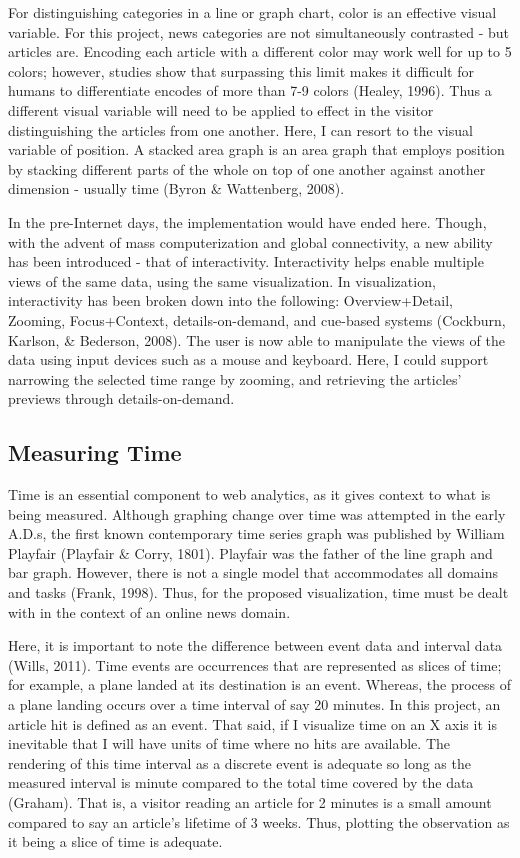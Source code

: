 \documentclass[12pt]{article}
\begin{document}
For distinguishing categories in a line or graph chart, color is an effective visual variable. For this project, news categories are not simultaneously contrasted - but articles are. Encoding each article with a different color may work well for up to 5 colors; however, studies show that surpassing this limit makes it difficult for humans to differentiate encodes of more than 7-9 colors (Healey, 1996). Thus a different visual variable will need to be applied to effect in the visitor distinguishing the articles from one another. Here, I can resort to the visual variable of position. A stacked area graph is an area graph that employs position by stacking different parts of the whole on top of one another against another dimension - usually time (Byron \& Wattenberg, 2008).  

In the pre-Internet days, the implementation would have ended here. Though, with the advent of mass computerization and global connectivity, a new ability has been introduced - that of interactivity. Interactivity helps enable multiple views of the same data, using the same visualization. In visualization, interactivity has been broken down into the following: Overview+Detail, Zooming, Focus+Context, details-on-demand, and cue-based systems (Cockburn, Karlson, \& Bederson, 2008). The user is now able to manipulate the views of the data using input devices such as a mouse and keyboard. Here, I could support narrowing the selected time range by zooming, and retrieving the articles' previews through details-on-demand. 


\subsection{Measuring Time}
Time is an essential component to web analytics, as it gives context to what is being measured. Although graphing change over time was attempted in the early A.D.s, the first known contemporary time series graph was published by William Playfair (Playfair \& Corry, 1801). Playfair was the father of the line graph and bar graph. However, there is not a single model that accommodates all domains and tasks (Frank, 1998). Thus, for the proposed visualization, time must be dealt with in the context of an online news domain.   

Here, it is important to note the difference between event data and interval data (Wills, 2011). Time events are occurrences that are represented as slices of time; for example, a plane landed at its destination is an event. Whereas, the process of a plane landing occurs over a time interval of say 20 minutes. In this project, an article hit is defined as an event. That said, if I visualize time on an X axis it is inevitable that I will have units of time where no hits are available. The rendering of this time interval as a discrete event is adequate so long as the measured interval is minute compared to the total time covered by the data (Graham). That is, a visitor reading an article for 2 minutes is a small amount compared to say an article's lifetime of 3 weeks. Thus, plotting the observation as it being a slice of time is adequate.  
\end{document}

